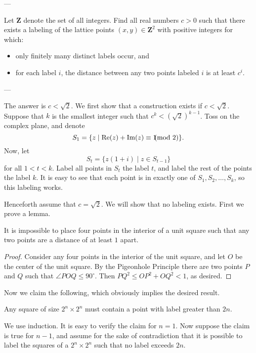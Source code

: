
---

Let $\mathbf{Z}$ denote the set of all integers. Find all real numbers $c>0$ such that there exists a labeling of the lattice points $(x,y)\in\mathbf{Z}^2$ with positive integers for which:
\begin{itemize}[itemsep=0em]
    \item only finitely many distinct labels occur, and
    \item for each label $i$, the distance between any two points labeled $i$ is at least $c^i$.
\end{itemize}

---

The answer is $c<\sqrt2$. We first show that a construction exists if $c<\sqrt2$. Suppose that $k$ is the smallest integer such that $c^k<(\sqrt2)^{k-1}$. Toss on the complex plane, and denote \[S_1=\{z\mid\text{Re}(z)+\text{Im}(z)\equiv 1\hspace{-0.75em}\pmod2\}.\]
Now, let \[S_t=\{z(1+i)\mid z\in S_{t-1}\}\]
for all $1<t<k$. Label all points in $S_t$ the label $t$, and label the rest of the points the label $k$. It is easy to see that each point is in exactly one of $S_1,S_2,\ldots,S_k$, so this labeling works.

Henceforth assume that $c=\sqrt2$. We will show that no labeling exists. First we prove a lemma.
\begin{boxlemma*}
    It is impossible to place four points in the interior of a unit square such that any two points are a distance of at least $1$ apart.
\end{boxlemma*}
\begin{proof}
    Consider any four points in the interior of the unit square, and let $O$ be the center of the unit square. By the Pigeonhole Principle there are two points $P$ and $Q$ such that $\angle POQ\le90^\circ$. Then $PQ^2\le OP^2+OQ^2<1$, as desired.
\end{proof}

Now we claim the following, which obviously implies the desired result.
\begin{iclaim*}
    Any square of size $2^n\times2^n$ must contain a point with label greater than $2n$.
\end{iclaim*}
We use induction. It is easy to verify the claim for $n=1$. Now suppose the claim is true for $n-1$, and assume for the sake of contradiction that it is possible to label the squares of a $2^n\times2^n$ such that no label exceeds $2n$.

